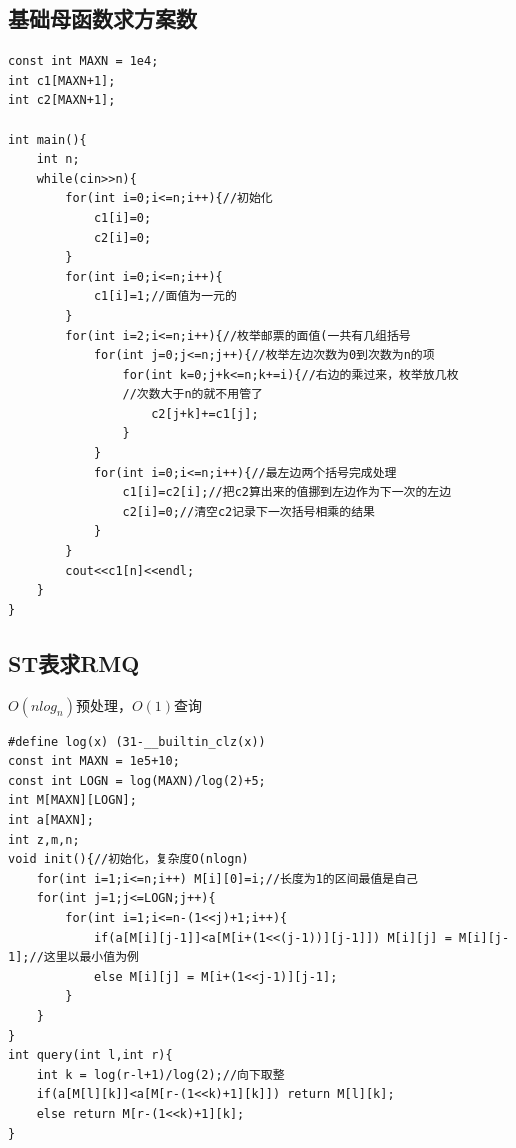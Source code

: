 \documentclass[a4]{ctexart}
\begin{document}
\subsection{基础母函数求方案数}
\begin{lstlisting}
const int MAXN = 1e4;
int c1[MAXN+1];
int c2[MAXN+1];

int main(){
	int n;
	while(cin>>n){ 
		for(int i=0;i<=n;i++){//初始化 
			c1[i]=0;
			c2[i]=0;
		}
		for(int i=0;i<=n;i++){
			c1[i]=1;//面值为一元的
		}
		for(int i=2;i<=n;i++){//枚举邮票的面值(一共有几组括号 
			for(int j=0;j<=n;j++){//枚举左边次数为0到次数为n的项 
				for(int k=0;j+k<=n;k+=i){//右边的乘过来，枚举放几枚
				//次数大于n的就不用管了 
					c2[j+k]+=c1[j];
				}
			}
			for(int i=0;i<=n;i++){//最左边两个括号完成处理 
				c1[i]=c2[i];//把c2算出来的值挪到左边作为下一次的左边 
				c2[i]=0;//清空c2记录下一次括号相乘的结果 
			}
		}
		cout<<c1[n]<<endl; 
	} 
} 
\end{lstlisting}

\subsection{ST表求RMQ}
$O(nlog_n)$预处理，$O(1)$查询
\begin{lstlisting}
#define log(x) (31-__builtin_clz(x))
const int MAXN = 1e5+10;
const int LOGN = log(MAXN)/log(2)+5;
int M[MAXN][LOGN]; 
int a[MAXN];
int z,m,n;
void init(){//初始化，复杂度O(nlogn) 
	for(int i=1;i<=n;i++) M[i][0]=i;//长度为1的区间最值是自己 
	for(int j=1;j<=LOGN;j++){
		for(int i=1;i<=n-(1<<j)+1;i++){
			if(a[M[i][j-1]]<a[M[i+(1<<(j-1))][j-1]]) M[i][j] = M[i][j-1];//这里以最小值为例 
			else M[i][j] = M[i+(1<<j-1)][j-1];
		}
	} 
}
int query(int l,int r){
	int k = log(r-l+1)/log(2);//向下取整
	if(a[M[l][k]]<a[M[r-(1<<k)+1][k]]) return M[l][k];
	else return M[r-(1<<k)+1][k];
}
\end{lstlisting}

\begin{lstlisting}

\end{lstlisting}
\end{document}
